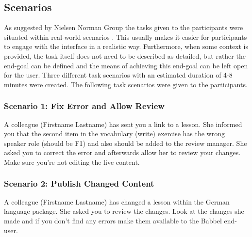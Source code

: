 
\subsection{Scenarios} \label{sec:scenario-descriptions}
As suggested by Nielsen Norman Group the tasks given to the participants were situated within real-world scenarios \cite{_task_2014}. This usually makes it easier for participants to engage with the interface in a realistic way. Furthermore, when some context is provided, the task itself does not need to be described as detailed, but rather the end-goal can be defined and the means of achieving this end-goal can be left open for the user. Three different task scenarios with an estimated duration of 4-8 minutes were created. The following task scenarios were given to the participants.

\subsubsection{Scenario 1: Fix Error and Allow Review}
A colleague (Firstname Lastname) has sent you a link to a lesson. She informed you that the second item in the vocabulary (write) exercise has the wrong speaker role (should be F1) and also should be added to the review manager. She asked you to correct the error and afterwards allow her to review your changes. Make sure you’re not editing the live content.


\subsubsection{Scenario 2: Publish Changed Content}
A colleague (Firstname Lastname) has changed a lesson within the German language package. She asked you to review the changes. Look at the changes she made and if you don’t find any errors make them available to the Babbel end-user.


